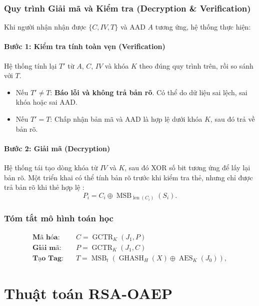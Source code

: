 \subsubsection{Quy trình Giải mã và Kiểm tra (Decryption \& Verification)}
Khi người nhận nhận được $\{C, IV, T\}$ và AAD $A$ tương ứng, hệ thống thực hiện:

\paragraph{Bước 1: Kiểm tra tính toàn vẹn (Verification)}
Hệ thống tính lại $T'$ từ $A$, $C$, $IV$ và khóa $K$ theo đúng quy trình trên, rồi so sánh với $T$.
\begin{itemize}
    \item Nếu $T' \neq T$: \textbf{Báo lỗi và không trả bản rõ}. Có thể do dữ liệu sai lệch, sai khóa hoặc sai AAD.
    \item Nếu $T' = T$: Chấp nhận bản mã và AAD là hợp lệ dưới khóa $K$, sau đó trả về bản rõ.
\end{itemize}

\paragraph{Bước 2: Giải mã (Decryption)}
Hệ thống tái tạo dòng khóa từ $IV$ và $K$, sau đó XOR số bit tương ứng để lấy lại bản rõ. Một triển khai có thể tính bản rõ trước khi kiểm tra thẻ, nhưng chỉ được trả bản rõ khi thẻ hợp lệ \cite{gcmnist}:
\begin{equation}
    P_i=C_i\oplus\operatorname{MSB}_{\operatorname{len}(C_i)}(S_i).
\end{equation}

\subsubsection{Tóm tắt mô hình toán học}
\begin{align*}
    \textbf{Mã hóa:} & \quad C=\operatorname{GCTR}_K(J_1,P) \\
    \textbf{Giải mã:} & \quad P=\operatorname{GCTR}_K(J_1,C) \\
    \textbf{Tạo Tag:} & \quad T = \operatorname{MSB}_{t}\!\left(\operatorname{GHASH}_{H}(X)\oplus\operatorname{AES}_K(J_0)\right),
\end{align*}


\section{Thuật toán RSA-OAEP}

